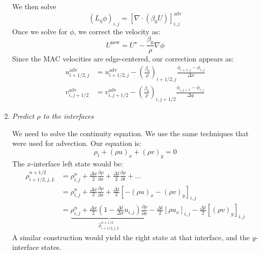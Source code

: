 \begin{enumerate}
  We then solve
  \begin{equation}
    (L_\eta\phi)_{i,j} =
    \left [ \nabla \cdot (\beta_0 U) \right ]_{i,j}^\mathrm{adv}
  \end{equation}
  Once we solve for $\phi$, we correct the velocity as:
  \begin{equation}
    U^\mathrm{new} = U^\star - \frac{\beta_0}{\rho} \nabla \phi
  \end{equation}
  Since the MAC velocities are edge-centered, our correction appears as:
  \begin{align}
    u^\mathrm{adv}_{i+1/2,j} &= u^\mathrm{adv}_{i+1/2,j} -
    \left (\frac{\beta_0}{\rho}\right )_{i+1/2,j}
    \frac{\phi_{i+1,j} - \phi_{i,j}}{\Delta x} \\
    v^\mathrm{adv}_{i,j+1/2} &= v^\mathrm{adv}_{i,j+1/2} -
    \left (\frac{\beta_0}{\rho}\right )_{i,j+1/2}
    \frac{\phi_{i,j+1} - \phi_{i,j}}{\Delta y} 
  \end{align}
  
\item {\em Predict $\rho$ to the interfaces}

\label{sec:lm:density}

We need to solve the continuity equation.  We use the same techniques
that were used for advection.  Our equation is:
\begin{equation}
\rho_t + (\rho u)_x + (\rho v)_y = 0
\end{equation}
The $x$-interface left state would be:
\begin{align}
\rho_{i+1/2,j,L}^{n+1/2} &= \rho_{i,j}^n + 
   \frac{\Delta x}{2} \frac{\partial \rho}{\partial x} +
   \frac{\Delta t}{2} \frac{\partial \rho}{\partial t} + \ldots \nonumber \\
%
 &= \rho_{i,j}^n + 
    \frac{\Delta x}{2} \frac{\partial \rho}{\partial x} +
    \frac{\Delta t}{2} \left [ -(\rho u)_x -(\rho v)_y \right ]_{i,j} \nonumber\\
%
 &= \underbrace{\rho_{i,j}^n + 
   \frac{\Delta x}{2} \left ( 1 - \frac{\Delta t}{\Delta x} u_{i,j} \right )
        \frac{\partial \rho}{\partial x}}_{\hat{\rho}_{i+1/2,j,L}^{n+1/2}}
   - \frac{\Delta t}{2} \left [\rho u_x \right ]_{i,j} 
   - \frac{\Delta t}{2} \left [ (\rho v)_y \right ]_{i,j}
\end{align}
A similar construction would yield the right state at that interface, and the
$y$-interface states.


\end{enumerate}
